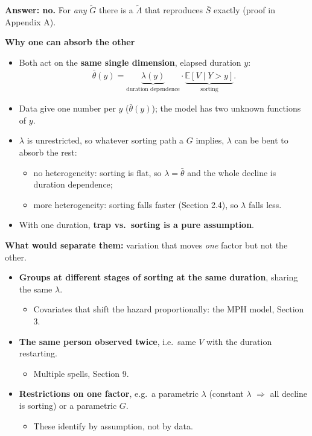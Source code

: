 \documentclass[11pt]{article}
\newcommand{\E}{\mathbb{E}}
\newcommand{\1}{\mathbf{1}}
\begin{document}
\textbf{Answer: no.} For \emph{any} $\tilde G$ there is a $\tilde\Lambda$ that reproduces $\bar S$ exactly (proof in Appendix A).

\textbf{Why one can absorb the other}
\begin{itemize}
  \item Both act on the \textbf{same single dimension}, elapsed duration $y$:
    \begin{align}
      \bar\theta(y) = \underbrace{\lambda(y)}_{\text{duration dependence}}\cdot\underbrace{\E[V\mid Y>y]}_{\text{sorting}}. \nonumber
    \end{align}
  \item Data give one number per $y$ ($\bar\theta(y)$); the model has two unknown functions of $y$.
  \item $\lambda$ is unrestricted, so whatever sorting path a $G$ implies, $\lambda$ can be bent to absorb the rest:
    \begin{itemize}
      \item no heterogeneity: sorting is flat, so $\lambda=\bar\theta$ and the whole decline is duration dependence;
      \item more heterogeneity: sorting falls faster (Section 2.4), so $\lambda$ falls less.
    \end{itemize}
  \item With one duration, \textbf{trap vs.\ sorting is a pure assumption}.
\end{itemize}

\textbf{What would separate them:} variation that moves \emph{one} factor but not the other.
\begin{itemize}
  \item \textbf{Groups at different stages of sorting at the same duration}, sharing the same $\lambda$.
    \begin{itemize}
      \item Covariates that shift the hazard proportionally: the MPH model, Section 3.
    \end{itemize}
  \item \textbf{The same person observed twice}, i.e.\ same $V$ with the duration restarting.
    \begin{itemize}
      \item Multiple spells, Section 9.
    \end{itemize}
  \item \textbf{Restrictions on one factor}, e.g.\ a parametric $\lambda$ (constant $\lambda$ $\Rightarrow$ all decline is sorting) or a parametric $G$.
    \begin{itemize}
      \item These identify by assumption, not by data.
    \end{itemize}
\end{itemize}
\end{document}
